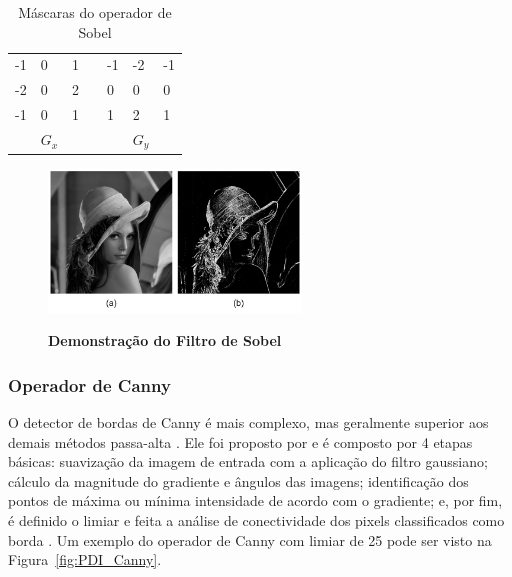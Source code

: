 \documentclass[12pt,oneside,a4paper,english,french,spanish,brazil,]{abntex2}
\begin{document}
\begin{table}
\centering
\caption{Máscaras do operador de Sobel}
\label{tab:Sobel}
\begin{tabular}{lllllll}
\cline{1-3} \cline{5-7}
\multicolumn{1}{|l|}{-1} & \multicolumn{1}{l|}{0} & \multicolumn{1}{l|}{1} & \multicolumn{1}{l|}{} & \multicolumn{1}{l|}{-1} & \multicolumn{1}{l|}{-2} & \multicolumn{1}{l|}{-1} \\ \cline{1-3} \cline{5-7} 
\multicolumn{1}{|l|}{-2} & \multicolumn{1}{l|}{0} & \multicolumn{1}{l|}{2} & \multicolumn{1}{l|}{} & \multicolumn{1}{l|}{0}  & \multicolumn{1}{l|}{0}  & \multicolumn{1}{l|}{0}  \\ \cline{1-3} \cline{5-7} 
\multicolumn{1}{|l|}{-1} & \multicolumn{1}{l|}{0} & \multicolumn{1}{l|}{1} & \multicolumn{1}{l|}{} & \multicolumn{1}{l|}{1}  & \multicolumn{1}{l|}{2}  & \multicolumn{1}{l|}{1}  \\ \cline{1-3} \cline{5-7} 
                         & \(G_x\)                   &                        &                       &                         & \(G_y\)                    &                        
\end{tabular}
\end{table}

\begin{figure}[ht]
\centering
\caption{\textbf{Demonstração do Filtro de Sobel}}
\includegraphics[width=0.6\textwidth]{imagens/PDI_Sobel.pdf}
\sourceAuthor
\label{fig:PDI_Sobel}
\end{figure}

\subsubsection{Operador de Canny}

O detector de bordas de Canny é mais complexo, mas geralmente superior aos demais métodos passa-alta \cite{gonzalez:2012}. Ele foi proposto por \citet{canny:1987} e é composto por 4 etapas básicas: suavização da imagem de entrada com a aplicação do filtro gaussiano; cálculo da magnitude do gradiente e ângulos das imagens; identificação dos pontos de máxima ou mínima intensidade de acordo com o gradiente; e, por fim, é definido o limiar e feita a análise de conectividade dos pixels classificados como borda \cite{gonzalez:2012}. Um exemplo do operador de Canny com limiar de 25 pode ser visto na Figura~\ref{fig:PDI_Canny}.
\end{document}
